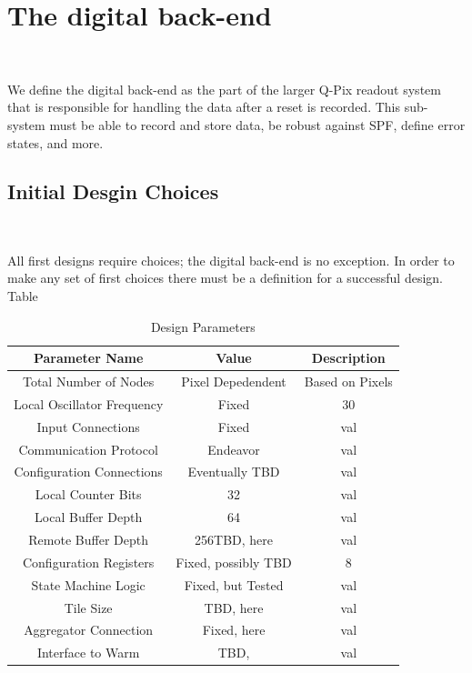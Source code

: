 \section{The digital back-end}~\label{sec:digital_back-end}

We define the digital back-end as the part of the larger Q-Pix readout system that is responsible for handling the data after a reset is recorded.
This sub-system must be able to record and store data, be robust against SPF, define error states, and more.

\subsection{Initial Desgin Choices}~\label{sec:design_choices}

All first designs require choices; the digital back-end is no exception.
In order to make any set of first choices there must be a definition for a successful design.
Table

\begin{table}
\begin{center}
\begin{tabular}{||c c c||}
 \hline
 Parameter Name & Value & Description \\ 
 \hline\hline
Total Number of Nodes & Pixel Depedendent & Based on Pixels \\
 \hline
Local Oscillator Frequency & Fixed & 30 \\
 \hline
Input Connections & Fixed & val \\
 \hline
Communication Protocol & Endeavor & val \\
 \hline
Configuration Connections & Eventually TBD & val \\
 \hline
Local Counter Bits & 32 & val \\
 \hline
Local Buffer Depth & 64 & val \\
 \hline
Remote Buffer Depth & 256TBD, here & val \\
 \hline
Configuration Registers & Fixed, possibly TBD & 8 \\
 \hline
State Machine Logic & Fixed, but Tested & val \\
 \hline
Tile Size & TBD, here & val \\
 \hline
Aggregator Connection & Fixed, here & val \\
 \hline
Interface to Warm & TBD, & val \\
 \hline
 \hline
\end{tabular}
\caption{Design Parameters}
\end{center}
\end{table}
~\label{table:digital_design_params}



